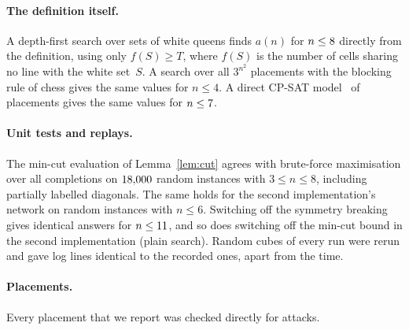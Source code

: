 \documentclass[11pt]{article}
\theoremstyle{remark}
\begin{document}
\paragraph{The definition itself.} A depth-first search over sets of white queens finds $a(n)$ for
$n\le8$ directly from the definition, using only $f(S)\ge T$, where $f(S)$ is the number of
cells sharing no line with the white set~$S$. A search over all $3^{n^2}$ placements with the blocking
rule of chess gives the same values for $n\le4$. A direct CP-SAT model~\cite{ORTools} of placements gives
the same values for $n\le7$.

\paragraph{Unit tests and replays.} The min-cut evaluation of Lemma~\ref{lem:cut} agrees with brute-force
maximisation over all completions on $18{,}000$ random instances with $3\le n\le8$, including partially
labelled diagonals. The same holds for the second implementation's network on random instances with
$n\le6$. Switching off the symmetry breaking gives identical answers for $n\le11$, and so does
switching off the min-cut bound in the second implementation (plain search). Random cubes of every run were rerun
and gave log lines identical to the recorded ones, apart from the time.

\paragraph{Placements.} Every placement that we report was checked directly for attacks.
\end{document}
